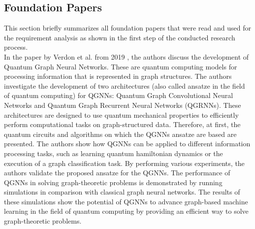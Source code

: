 \subsection{Foundation Papers}
This section briefly summarizes all foundation papers that were read and used for the requirement analysis as shown in the first step of the conducted research process. \\

In the paper by Verdon et al. from 2019 \cite{verdon_quantum_2019}, the authors discuss the development of Quantum Graph Neural Networks. These are quantum computing models for processing information that is represented in graph structures. The authors investigate the development of two architectures (also called ansatze in the field of quantum computing) for QGNNs: Quantum Graph Convolutional Neural Networks and Quantum Graph Recurrent Neural Networks (QGRNNs). These architectures are designed to use quantum mechanical properties to efficiently perform computational tasks on graph-structured data. Therefore, at first, the quantum circuits and algorithms on which the QGNNs ansatze are based are presented. The authors show how QGNNs can be applied to different information processing tasks, such as learning quantum hamiltonian dynamics or the execution of a graph classification task. By performing various experiments, the authors validate the proposed ansatze for the QGNNs. The performance of QGNNs in solving graph-theoretic problems is demonstrated by running simulations in comparison with classical graph neural networks. The results of these simulations show the potential of QGNNs to advance graph-based machine learning in the field of quantum computing by providing an efficient way to solve graph-theoretic problems. \\

